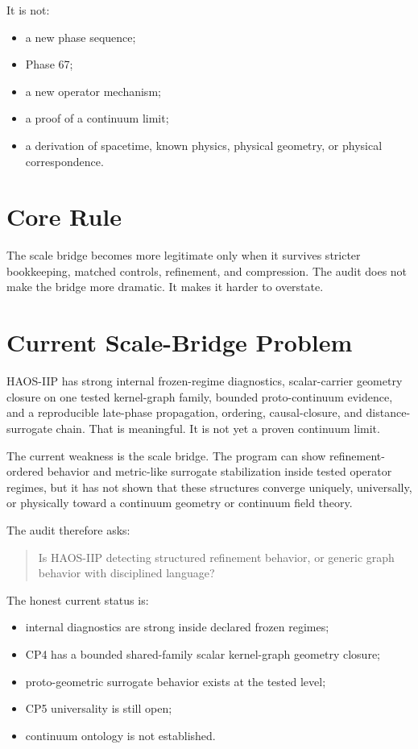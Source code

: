\documentclass[11pt]{article}
\begin{document}
It is not:
\begin{itemize}
\item a new phase sequence;
\item Phase 67;
\item a new operator mechanism;
\item a proof of a continuum limit;
\item a derivation of spacetime, known physics, physical geometry, or physical correspondence.
\end{itemize}

\section{Core Rule}

\begin{center}
\end{center}

The scale bridge becomes more legitimate only when it survives stricter bookkeeping, matched controls, refinement, and compression. The audit does not make the bridge more dramatic. It makes it harder to overstate.

\section{Current Scale-Bridge Problem}

HAOS-IIP has strong internal frozen-regime diagnostics, scalar-carrier geometry closure on one tested kernel-graph family, bounded proto-continuum evidence, and a reproducible late-phase propagation, ordering, causal-closure, and distance-surrogate chain. That is meaningful. It is not yet a proven continuum limit.

The current weakness is the scale bridge. The program can show refinement-ordered behavior and metric-like surrogate stabilization inside tested operator regimes, but it has not shown that these structures converge uniquely, universally, or physically toward a continuum geometry or continuum field theory.

The audit therefore asks:
\begin{quote}
Is HAOS-IIP detecting structured refinement behavior, or generic graph behavior with disciplined language?
\end{quote}

The honest current status is:
\begin{itemize}
\item internal diagnostics are strong inside declared frozen regimes;
\item CP4 has a bounded shared-family scalar kernel-graph geometry closure;
\item proto-geometric surrogate behavior exists at the tested level;
\item CP5 universality is still open;
\item continuum ontology is not established.
\end{itemize}
\end{document}
